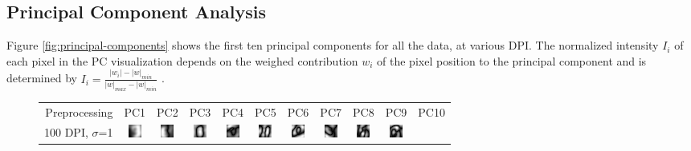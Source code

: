\subsection{Principal Component Analysis}
Figure \ref{fig:principal-components} shows the first ten principal
components for all the data, at various DPI.
The normalized intensity \(I_i\) of each pixel in the PC visualization
depends on the weighed contribution \(w_i\) of the pixel position to the principal component
and is determined by
\(I_i=\frac{\left|w_i\right|-\left|w\right|_{min}}{\left|w\right|_{max}-\left|w\right|_{min}}\)
.
\begin{figure}[ht]
\centering
\setlength\tabcolsep{1pt}
\begin{tabular}{r*{10}{c}}
Preprocessing & PC1 & PC2 & PC3 & PC4 & PC5 & PC6 & PC7 & PC8 & PC9 & PC10 \\
100 DPI, \(\sigma\)=1
 & \includegraphics[width=\smallfigscale]{img/pca-All-dpi100-sigma1-pc1} 
 & \includegraphics[width=\smallfigscale]{img/pca-All-dpi100-sigma1-pc2} 
 & \includegraphics[width=\smallfigscale]{img/pca-All-dpi100-sigma1-pc3} 
 & \includegraphics[width=\smallfigscale]{img/pca-All-dpi100-sigma1-pc4} 
 & \includegraphics[width=\smallfigscale]{img/pca-All-dpi100-sigma1-pc5} 
 & \includegraphics[width=\smallfigscale]{img/pca-All-dpi100-sigma1-pc6} 
 & \includegraphics[width=\smallfigscale]{img/pca-All-dpi100-sigma1-pc7} 
 & \includegraphics[width=\smallfigscale]{img/pca-All-dpi100-sigma1-pc8} 
 & \includegraphics[width=\smallfigscale]{img/pca-All-dpi100-sigma1-pc9} 

\end{tabular}
\end{figure}
